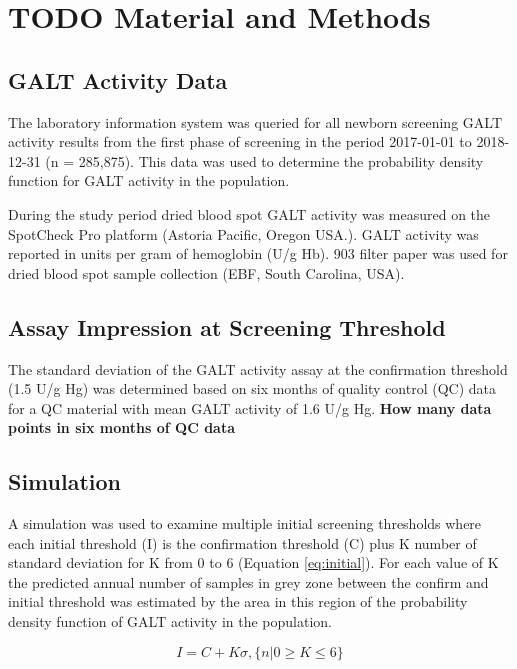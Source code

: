 \documentclass[review]{elsarticle}
\begin{document}
\clearpage

\section*{{\bfseries\sffamily TODO} Material and Methods}
\label{sec:orgda7ab7f}
\subsection*{GALT Activity Data}
\label{sec:org61b1553}
The laboratory information system was queried for all newborn
screening GALT activity results from the first phase of screening in
the period 2017-01-01 to 2018-12-31 (n = 285,875). This data was used
to determine the probability density function for GALT activity in the
population.

During the study period dried blood spot GALT activity was measured
on the SpotCheck Pro platform (Astoria Pacific, Oregon USA.). GALT
activity was reported in units per gram of hemoglobin (U/g Hb). 903
filter paper was used for dried blood spot sample collection (EBF,
South Carolina, USA).

\subsection*{Assay Impression at Screening Threshold}
\label{sec:org4370747}
The standard deviation of the GALT activity assay at the confirmation
threshold (1.5 U/g Hg) was determined based on six months of quality
control (QC) data for a QC material with mean GALT activity of 1.6 U/g
Hg.  \textbf{How many data points in six months of QC data}

\subsection*{Simulation}
\label{sec:org1e30e5d}
A simulation was used to examine multiple initial screening thresholds
where each initial threshold (I) is the confirmation threshold (C)
plus K number of standard deviation for K from 0 to 6 (Equation
\ref{eq:initial}). For each value of K the predicted annual number of
samples in grey zone between the confirm and initial threshold was
estimated by the area in this region of the probability density
function of GALT activity in the population.

\begin{equation}\label{eq:initial}
I = C + K\sigma , \{n|0\ge K\le6\} 
\end{equation}
\end{document}
